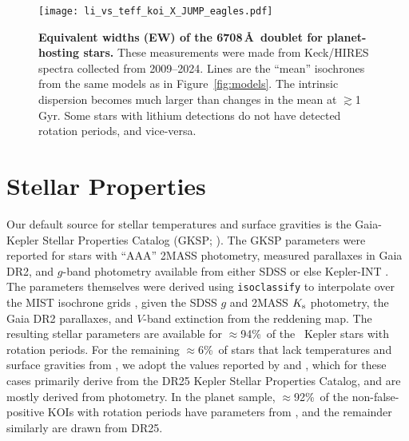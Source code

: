 \documentclass[11pt,twocolumn,tighten]{aastex63}
\newcommand{\fracstarswithprotwithbtwenty}{{$\approx$94\%}}
\newcommand{\fracstarswithprotwithoutbtwenty}{{$\approx$6\%}}
\newcommand{\frackoisnofpwithprotwithbtwenty}{{$\approx$92\%}}
\begin{document}
\begin{figure}[!t]
	\begin{center}
		\leavevmode
		\texttt{[image: li\_vs\_teff\_koi\_X\_JUMP\_eagles.pdf]}
	\end{center}
	\vspace{-0.25cm}
	\caption{{\bf Equivalent widths (EW) of the  6708\,\AA\ doublet
    for planet-hosting stars.} These measurements were made from
    Keck/HIRES spectra collected from 2009--2024.  Lines are the ``mean''
    isochrones from the same models as in Figure~\ref{fig:models}.  The
    intrinsic dispersion becomes much larger
    than changes in the mean at $\gtrsim$1\,Gyr.  Some stars with lithium detections do
    not have detected rotation periods, and vice-versa.
		\label{fig:li_vs_teff}
	}
\end{figure}



\section{Stellar Properties}
\label{sec:stellarprops}




Our default source for stellar temperatures and surface gravities is
the Gaia-Kepler Stellar Properties Catalog (GKSP;
\citealt{Berger_2020a_catalog}).  The GKSP parameters were reported
for stars with ``AAA'' 2MASS photometry, measured parallaxes in Gaia
DR2,  and $g$-band photometry available from either SDSS or else Kepler-INT
\citep{2012AJ....144...24G}.  The parameters themselves were derived using
\texttt{isoclassify} \citep{2017ApJ...844..102H} to interpolate over
the MIST isochrone grids \citep{Choi_2016,2016ApJS..222....8D}, given
the SDSS $g$ and 2MASS $K_{\rm s}$ photometry, the Gaia DR2
parallaxes, and $V$-band extinction from the
\citet{2019ApJ...887...93G} reddening map.  The resulting stellar
parameters are available for \fracstarswithprotwithbtwenty\ of the
\nuniqstarsantosrot\ Kepler stars with rotation periods.  For the
remaining \fracstarswithprotwithoutbtwenty\ of stars that lack
temperatures and surface gravities from
, we adopt the values reported by
\citet{Santos_2019} and \citet{Santos_2021}, which for these cases
primarily derive from the \citet{Mathur_2017} DR25 Kepler Stellar
Properties Catalog, and are mostly derived from photometry.  In the
planet sample, \frackoisnofpwithprotwithbtwenty\ of the
non-false-positive KOIs with rotation periods have parameters from
\citet{Berger_2020a_catalog}, and the remainder similarly are drawn
from DR25. 
\end{document}
